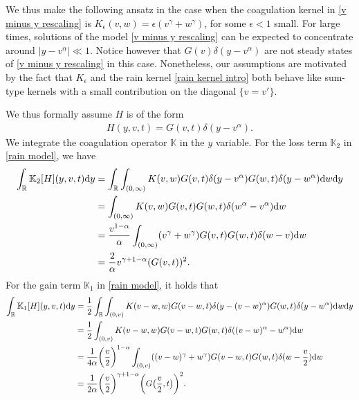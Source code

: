 \documentclass[11pt]{article}
\numberwithin{equation}{section}
\newcommand{\der}{\textup{d}}
\begin{document}
\begin{ans}\label{ansatz} We thus make the following ansatz in the case when the coagulation kernel in \eqref{v minus y rescaling} is $K_{\epsilon}(v,w)=\epsilon(v^{\gamma}+w^{\gamma})$, for some $\epsilon<1$ small. For large times, solutions of the model \eqref{v minus y rescaling} can be expected to concentrate around $|y-v^{\alpha}|\ll 1$. Notice however that  $G(v)\delta(y-v^{\alpha})$ are not steady states of \eqref{v minus y rescaling} in this case. Nonetheless, our assumptions are motivated by the fact that $K_{\epsilon}$ and the rain kernel \eqref{rain kernel intro}  both behave like sum-type kernels with a small contribution  on the diagonal $\{v=v'\}$.
\end{ans}
 We thus formally assume $H$ is of the form 
\begin{align}\label{y v alpha limit form}
    H(y,v,t)=G(v,t)\delta(y-v^{\alpha}).
\end{align}
 We integrate the coagulation operator $\mathbb{K}$ in the $y$ variable. For the loss term $\mathbb{K}_{2}$ in \eqref{rain model}, we have
\begin{align*}\int_{\mathbb{R}} \mathbb{K}_{2}[H](y,v,t)\der y &=\int_{\mathbb{R}}\int_{(0,\infty)}K(v,w)G(v,t)\delta(y-v^{\alpha})G(w,t)\delta(y-w^{\alpha})\der w \der y\\
    &=   \int_{(0,\infty)}K(v,w)G(v,t)G(w,t)\delta(w^{\alpha}-v^{\alpha})\der w
    \\
    &=   \frac{v^{1-\alpha}}{\alpha}\int_{(0,\infty)}(v^{\gamma}+w^{\gamma})G(v,t)G(w,t)\delta(w-v)\der w
       \\
    &=\frac{2}{\alpha}v^{\gamma+1-\alpha}(G(v,t))^{2}.
\end{align*}
For the gain term $\mathbb{K}_{1}$ in \eqref{rain model}, it holds that
\begin{align}\label{the gain term dirac}
 \int_{\mathbb{R}}\mathbb{K}_{1}[H](y,v,t) \der y  &=\frac{1}{2}\int_{\mathbb{R}}\int_{(0,v)}K(v-w,w)G(v-w,t)\delta(y-(v-w)^{\alpha})G(w,t)\delta(y-w^{\alpha})\der w \der y\nonumber\\
    &=   \frac{1}{2}\int_{(0,v)}K(v-w,w)G(v-w,t)G(w,t)\delta((v-w)^{\alpha}-w^{\alpha})\der w 
   \nonumber \\
    &=   \frac{1}{4\alpha}\bigg(\frac{v}{2}\bigg)^{1-\alpha}\int_{(0,v)}((v-w)^{\gamma}+w^{\gamma})G(v-w,t)G(w,t)\delta(w-\frac{v}{2})\der w
    \nonumber   \\
    &=   \frac{1}{2\alpha}\bigg(\frac{v}{2}\bigg)^{\gamma+1-\alpha}\bigg(G\big(\frac{v}{2},t\big)\bigg)^{2}.
\end{align}
\end{document}
